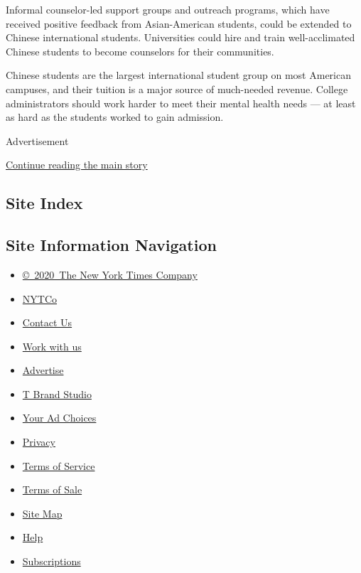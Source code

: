 Informal counselor-led support groups and outreach programs, which have
received positive feedback from Asian-American students, could be
extended to Chinese international students. Universities could hire and
train well-acclimated Chinese students to become counselors for their
communities.

Chinese students are the largest international student group on most
American campuses, and their tuition is a major source of much-needed
revenue. College administrators should work harder to meet their mental
health needs --- at least as hard as the students worked to gain
admission.

Advertisement

\protect\hyperlink{after-bottom}{Continue reading the main story}

\hypertarget{site-index}{%
\subsection{Site Index}\label{site-index}}

\hypertarget{site-information-navigation}{%
\subsection{Site Information
Navigation}\label{site-information-navigation}}

\begin{itemize}
\tightlist
\item
  \href{https://help.nytimes3xbfgragh.onion/hc/en-us/articles/115014792127-Copyright-notice}{©~2020~The
  New York Times Company}
\end{itemize}

\begin{itemize}
\tightlist
\item
  \href{https://www.nytco.com/}{NYTCo}
\item
  \href{https://help.nytimes3xbfgragh.onion/hc/en-us/articles/115015385887-Contact-Us}{Contact
  Us}
\item
  \href{https://www.nytco.com/careers/}{Work with us}
\item
  \href{https://nytmediakit.com/}{Advertise}
\item
  \href{http://www.tbrandstudio.com/}{T Brand Studio}
\item
  \href{https://www.nytimes3xbfgragh.onion/privacy/cookie-policy\#how-do-i-manage-trackers}{Your
  Ad Choices}
\item
  \href{https://www.nytimes3xbfgragh.onion/privacy}{Privacy}
\item
  \href{https://help.nytimes3xbfgragh.onion/hc/en-us/articles/115014893428-Terms-of-service}{Terms
  of Service}
\item
  \href{https://help.nytimes3xbfgragh.onion/hc/en-us/articles/115014893968-Terms-of-sale}{Terms
  of Sale}
\item
  \href{https://spiderbites.nytimes3xbfgragh.onion}{Site Map}
\item
  \href{https://help.nytimes3xbfgragh.onion/hc/en-us}{Help}
\item
  \href{https://www.nytimes3xbfgragh.onion/subscription?campaignId=37WXW}{Subscriptions}
\end{itemize}
